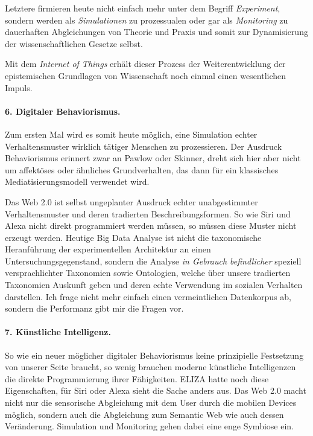 \documentclass[a4paper,11pt]{article}
\begin{document}
Letztere firmieren heute nicht einfach mehr unter dem Begriff
\emph{Experiment}, sondern werden als \emph{Simulationen} zu prozessualen oder
gar als \emph{Monitoring} zu dauerhaften Abgleichungen von Theorie und Praxis
und somit zur Dynamisierung der wissenschaftlichen Gesetze selbst.

Mit dem \emph{Internet of Things} erhält dieser Prozess der Weiterentwicklung
der epistemischen Grundlagen von Wissenschaft noch einmal einen wesentlichen
Impuls.

\paragraph{6. Digitaler Behaviorismus.}

Zum ersten Mal wird es somit heute möglich, eine Simulation echter
Verhaltensmuster wirklich tätiger Menschen zu prozessieren. Der Ausdruck
Behaviorismus erinnert zwar an Pawlow oder Skinner, dreht sich hier aber nicht
um affektöses oder ähnliches Grundverhalten, das dann für ein klassisches
Mediatisierungsmodell verwendet wird.

Das Web 2.0 ist selbst ungeplanter Ausdruck echter unabgestimmter
Verhaltensmuster und deren tradierten Beschreibungsformen. So wie Siri und
Alexa nicht direkt programmiert werden müssen, so müssen diese Muster nicht
erzeugt werden. Heutige Big Data Analyse ist nicht die taxonomische
Heranführung der experimentellen Architektur an einen Untersuchungsgegenstand,
sondern die Analyse \emph{in Gebrauch befindlicher} speziell versprachlichter
Taxonomien sowie Ontologien, welche über unsere tradierten Taxonomien Auskunft
geben und deren echte Verwendung im sozialen Verhalten darstellen. Ich frage
nicht mehr einfach einen vermeintlichen Datenkorpus ab, sondern die Performanz
gibt mir die Fragen vor.

\paragraph{7. Künstliche Intelligenz.}

So wie ein neuer möglicher digitaler Behaviorismus keine prinzipielle
Festsetzung von unserer Seite braucht, so wenig brauchen moderne künstliche
Intelligenzen die direkte Programmierung ihrer Fähigkeiten.  ELIZA hatte noch
diese Eigenschaften, für Siri oder Alexa sieht die Sache anders aus. Das Web
2.0 macht nicht nur die sensorische Abgleichung mit dem User durch die mobilen
Devices möglich, sondern auch die Abgleichung zum Semantic Web wie auch dessen
Veränderung.  Simulation und Monitoring gehen dabei eine enge Symbiose ein.
\end{document}
